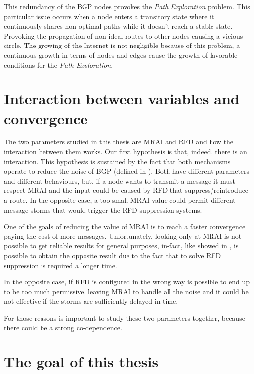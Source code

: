 This redundancy of the \ac{BGP} nodes provokes the \textit{Path Exploration}
problem.
This particular issue occurs when a node enters a transitory state where it
continuously shares non-optimal paths while it doesn't reach a stable state.
Provoking the propagation of non-ideal routes to other nodes causing a vicious
circle.
The growing of the Internet is not negligible because of this problem, a continuous
growth in terms of nodes and edges cause the growth of favorable conditions for
the \textit{Path Exploration}.

\section{Interaction between variables and convergence}
\label{sec:bgp_correlations}

The two parameters  studied in this thesis are \ac{MRAI} and \ac{RFD}
and how the interaction between them works.
Our first hypothesis is that, indeed, there is an interaction.
This hypothesis is sustained by the fact that both mechanisms operate to
reduce the noise of \ac{BGP} (defined in ).
Both have different parameters and different behaviours,
but, if a node wants to transmit a message it must respect \ac{MRAI} and the input
could be caused by \ac{RFD} that suppress/reintroduce a route.
In the opposite case, a too small \ac{MRAI} value could permit different message
storms that would trigger the \ac{RFD} suppression systems.

One of the goals of reducing the value of \ac{MRAI} is to reach a faster convergence
paying the cost of more messages.
Unfortunately, looking only at \ac{MRAI} is not possible to get reliable results
for general purposes, in-fact, like showed in , is possible
to obtain the opposite result due to the fact that to solve \ac{RFD} suppression
is required a longer time.

In the opposite case, if \ac{RFD} is configured in the wrong way is possible to
end up to be too much permissive, leaving \ac{MRAI} to handle all the noise and
it could be not effective if the storms are sufficiently delayed in time.

For those reasons is important to study these two parameters together, because
there could be a strong co-dependence.

\section{The goal of this thesis}
\label{sec:thesis_goal}

